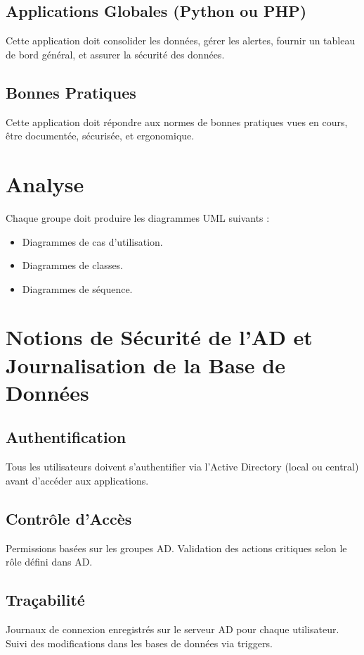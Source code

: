 \documentclass[a4paper,12pt]{report}
\begin{document}
\section{Applications Globales (Python ou PHP)}
Cette application doit consolider les données, gérer les alertes, fournir un tableau de bord général, et assurer la sécurité des données.

\section{Bonnes Pratiques}
Cette application doit répondre aux normes de bonnes pratiques vues en cours, être documentée, sécurisée, et ergonomique.

\chapter{Analyse}
Chaque groupe doit produire les diagrammes UML suivants :
\begin{itemize}
    \item Diagrammes de cas d'utilisation.
    \item Diagrammes de classes.
    \item Diagrammes de séquence.
\end{itemize}

\chapter{Notions de Sécurité de l'AD et Journalisation de la Base de Données}
\section{Authentification}
Tous les utilisateurs doivent s'authentifier via l'Active Directory (local ou central) avant d'accéder aux applications.

\section{Contrôle d'Accès}
Permissions basées sur les groupes AD. Validation des actions critiques selon le rôle défini dans AD.

\section{Traçabilité}
Journaux de connexion enregistrés sur le serveur AD pour chaque utilisateur. Suivi des modifications dans les bases de données via triggers.
\end{document}
